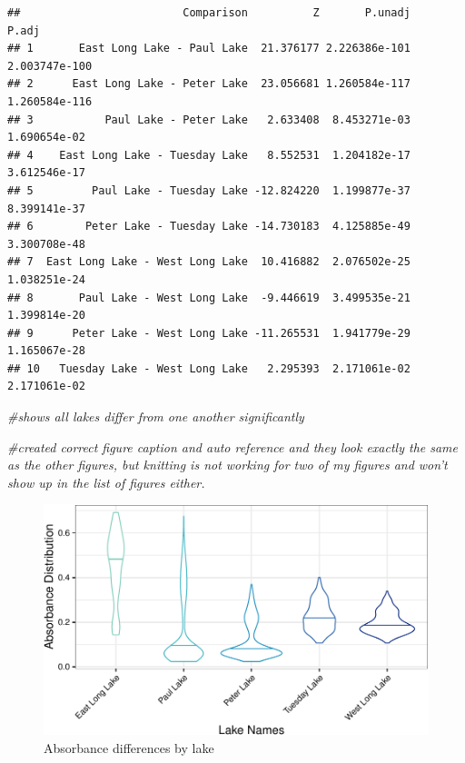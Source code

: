 \documentclass[12pt,]{article}
\newenvironment{Shaded}{\begin{snugshade}}{\end{snugshade}}
\newcommand{\KeywordTok}[1]{\textcolor[rgb]{0.13,0.29,0.53}{\textbf{#1}}}
\newcommand{\StringTok}[1]{\textcolor[rgb]{0.31,0.60,0.02}{#1}}
\newcommand{\CommentTok}[1]{\textcolor[rgb]{0.56,0.35,0.01}{\textit{#1}}}
\newcommand{\OperatorTok}[1]{\textcolor[rgb]{0.81,0.36,0.00}{\textbf{#1}}}
\newcommand{\NormalTok}[1]{#1}
\begin{document}
\begin{Shaded}
\end{Shaded}

\begin{verbatim}
##                         Comparison          Z       P.unadj         P.adj
## 1       East Long Lake - Paul Lake  21.376177 2.226386e-101 2.003747e-100
## 2      East Long Lake - Peter Lake  23.056681 1.260584e-117 1.260584e-116
## 3           Paul Lake - Peter Lake   2.633408  8.453271e-03  1.690654e-02
## 4    East Long Lake - Tuesday Lake   8.552531  1.204182e-17  3.612546e-17
## 5         Paul Lake - Tuesday Lake -12.824220  1.199877e-37  8.399141e-37
## 6        Peter Lake - Tuesday Lake -14.730183  4.125885e-49  3.300708e-48
## 7  East Long Lake - West Long Lake  10.416882  2.076502e-25  1.038251e-24
## 8       Paul Lake - West Long Lake  -9.446619  3.499535e-21  1.399814e-20
## 9      Peter Lake - West Long Lake -11.265531  1.941779e-29  1.165067e-28
## 10   Tuesday Lake - West Long Lake   2.295393  2.171061e-02  2.171061e-02
\end{verbatim}

\begin{Shaded}
\begin{Highlighting}[]
\CommentTok{#shows all lakes differ from one another significantly }

\CommentTok{#created correct figure caption and auto reference and they look exactly the same as the other figures, but knitting is not working for two of my figures and won't show up in the list of figures either.}
\end{Highlighting}
\end{Shaded}

\begin{figure}
\centering
\includegraphics{Bash_ENV872_Project_files/figure-latex/vio-1.pdf}
\caption{\label{fig:vio}Absorbance differences by lake}
\end{figure}
\end{document}
